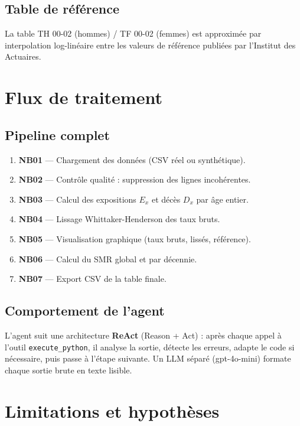 \documentclass[11pt,a4paper]{article}
\begin{document}
\subsection{Table de référence}
La table TH 00-02 (hommes) / TF 00-02 (femmes) est approximée par interpolation
log-linéaire entre les valeurs de référence publiées par l'Institut des Actuaires.

\section{Flux de traitement}

\subsection{Pipeline complet}
\begin{enumerate}
  \item \textbf{NB01} — Chargement des données (CSV réel ou synthétique).
  \item \textbf{NB02} — Contrôle qualité : suppression des lignes incohérentes.
  \item \textbf{NB03} — Calcul des expositions $E_x$ et décès $D_x$ par âge entier.
  \item \textbf{NB04} — Lissage Whittaker-Henderson des taux bruts.
  \item \textbf{NB05} — Visualisation graphique (taux bruts, lissés, référence).
  \item \textbf{NB06} — Calcul du SMR global et par décennie.
  \item \textbf{NB07} — Export CSV de la table finale.
\end{enumerate}

\subsection{Comportement de l'agent}
L'agent suit une architecture \textbf{ReAct} (Reason + Act) :
après chaque appel à l'outil \texttt{execute\_python}, il analyse la sortie,
détecte les erreurs, adapte le code si nécessaire, puis passe à l'étape suivante.
Un LLM séparé (gpt-4o-mini) formate chaque sortie brute en texte lisible.

\section{Limitations et hypothèses}
\end{document}
